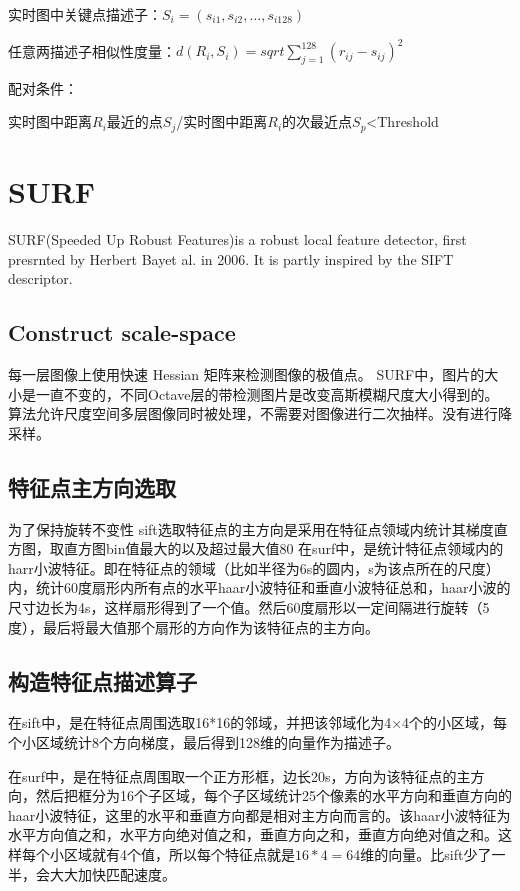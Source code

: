 \documentclass[12pt]{article}
\numberwithin{equation}{section}%
\begin{document}
实时图中关键点描述子：$S_{i}=(s_{i1},s_{i2},\ldots,s_{i128})$

任意两描述子相似性度量：$d(R_{i},S_{i})=sqrt{\sum_{j=1}^{128}(r_{ij}-s_{ij})^{2}}$

配对条件：

实时图中距离$R_{i}$最近的点$S_{j}$/实时图中距离$R_{i}$的次最近点$S_{p}$<Threshold


\section{SURF}

SURF(Speeded Up Robust Features)is a robust local feature detector, first presrnted by Herbert Bayet al. in 2006. It is partly inspired by the SIFT descriptor.
\subsection{Construct scale-space}
每一层图像上使用快速 Hessian 矩阵来检测图像的极值点。
SURF中，图片的大小是一直不变的，不同Octave层的带检测图片是改变高斯模糊尺度大小得到的。算法允许尺度空间多层图像同时被处理，不需要对图像进行二次抽样。没有进行降采样。


\subsection{特征点主方向选取}
为了保持旋转不变性
sift选取特征点的主方向是采用在特征点领域内统计其梯度直方图，取直方图bin值最大的以及超过最大值80%
在surf中，是统计特征点领域内的harr小波特征。即在特征点的领域（比如半径为6s的圆内，s为该点所在的尺度）内，统计60度扇形内所有点的水平haar小波特征和垂直小波特征总和，haar小波的尺寸边长为4s，这样扇形得到了一个值。然后60度扇形以一定间隔进行旋转（5度），最后将最大值那个扇形的方向作为该特征点的主方向。

\subsection{构造特征点描述算子}
在sift中，是在特征点周围选取16*16的邻域，并把该邻域化为4×4个的小区域，每个小区域统计8个方向梯度，最后得到128维的向量作为描述子。

在surf中，是在特征点周围取一个正方形框，边长20s，方向为该特征点的主方向，然后把框分为16个子区域，每个子区域统计25个像素的水平方向和垂直方向的haar小波特征，这里的水平和垂直方向都是相对主方向而言的。该haar小波特征为水平方向值之和，水平方向绝对值之和，垂直方向之和，垂直方向绝对值之和。这样每个小区域就有4个值，所以每个特征点就是$16*4=64$维的向量。比sift少了一半，会大大加快匹配速度。
\end{document}
